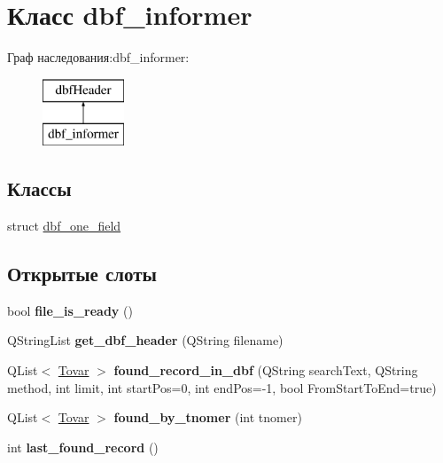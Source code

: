\hypertarget{classdbf__informer}{\section{Класс dbf\-\_\-informer}
\label{classdbf__informer}
}
Граф наследования\-:dbf\-\_\-informer\-:\begin{figure}[H]
\begin{center}
\leavevmode
\includegraphics[height=2.000000cm]{classdbf__informer}
\end{center}
\end{figure}
\subsection*{Классы}
\begin{DoxyCompactItemize}
\item 
struct \hyperlink{structdbf__informer_1_1dbf__one__field}{dbf\-\_\-one\-\_\-field}
\end{DoxyCompactItemize}
\subsection*{Открытые слоты}
\begin{DoxyCompactItemize}
\item 
\hypertarget{classdbf__informer_a3d134ff2360a3805d4d2fe5abb16fa12}{bool {\bfseries file\-\_\-is\-\_\-ready} ()}\label{classdbf__informer_a3d134ff2360a3805d4d2fe5abb16fa12}

\item 
\hypertarget{classdbf__informer_ae2e05b62e6891c619329dffcd526622c}{\-Q\-String\-List {\bfseries get\-\_\-dbf\-\_\-header} (\-Q\-String filename)}\label{classdbf__informer_ae2e05b62e6891c619329dffcd526622c}

\item 
\hypertarget{classdbf__informer_acc9c00792f055b450b34941c24d01755}{\-Q\-List$<$ \hyperlink{struct_tovar}{\-Tovar} $>$ {\bfseries found\-\_\-record\-\_\-in\-\_\-dbf} (\-Q\-String search\-Text, \-Q\-String method, int limit, int start\-Pos=0, int end\-Pos=-\/1, bool \-From\-Start\-To\-End=true)}\label{classdbf__informer_acc9c00792f055b450b34941c24d01755}

\item 
\hypertarget{classdbf__informer_a2b4778d6aed4d9180b4143eb44afbea5}{\-Q\-List$<$ \hyperlink{struct_tovar}{\-Tovar} $>$ {\bfseries found\-\_\-by\-\_\-tnomer} (int tnomer)}\label{classdbf__informer_a2b4778d6aed4d9180b4143eb44afbea5}

\item 
\hypertarget{classdbf__informer_acfeaf3fc3469577f5ebad2541adf935f}{int {\bfseries last\-\_\-found\-\_\-record} ()}\label{classdbf__informer_acfeaf3fc3469577f5ebad2541adf935f}

\end{DoxyCompactItemize}
